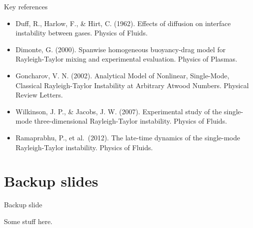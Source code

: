 \documentclass[12pt]{beamer}
\begin{document}
\appendix

\begin{frame}{Key references}

{\footnotesize
\begin{itemize}
  \item Duff, R., Harlow, F., \& Hirt, C. (1962). Effects of diffusion on interface instability between gases. Physics of Fluids. 
  \item Dimonte, G. (2000). Spanwise homogeneous buoyancy-drag model for Rayleigh-Taylor mixing and experimental evaluation. Physics of Plasmas.
  \item Goncharov, V. N. (2002). Analytical Model of Nonlinear, Single-Mode, Classical Rayleigh-Taylor Instability at Arbitrary Atwood Numbers. Physical Review Letters. 
  \item Wilkinson, J. P., \& Jacobs, J. W. (2007). Experimental study of the single-mode three-dimensional Rayleigh-Taylor instability. Physics of Fluids.
  \item Ramaprabhu, P., et al.\ (2012). The late-time dynamics of the single-mode Rayleigh-Taylor instability. Physics of Fluids.
\end{itemize}
}
\end{frame}

\section*{Backup slides}
\begin{frame}{Backup slide}

	Some stuff here.

\end{frame}

\end{document}
